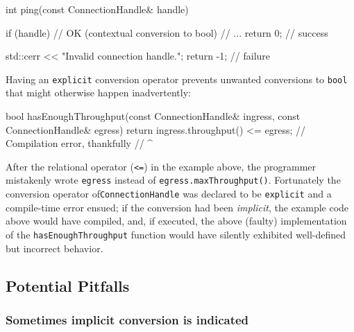 \begin{emcppslisting}[language=C++]
int ping(const ConnectionHandle& handle)
{
    if (handle)  // OK (contextual conversion to bool)
    {
        // ...
        return 0;  // success
    }

    std::cerr << "Invalid connection handle.\n";
    return -1;  // failure
}
\end{emcppslisting}
    
\noindent Having an \lstinline!explicit! conversion operator prevents unwanted
conversions to \lstinline!bool! that might otherwise happen inadvertently:

\begin{emcppslisting}[language=C++]
bool hasEnoughThroughput(const ConnectionHandle& ingress,
                         const ConnectionHandle& egress)
{
    return ingress.throughput() <= egress;  // Compilation error, thankfully
//                                    ^~~~~~
}
\end{emcppslisting}
    
\noindent After the relational operator (\lstinline!<=!) in the example above, the
programmer mistakenly wrote \lstinline!egress! instead of
\mbox{\lstinline!egress.maxThroughput()!}. Fortunately the conversion operator of\linebreak[4] %
\mbox{\lstinline!ConnectionHandle!} was declared to be \lstinline!explicit! and a
compile-time error ensued; if the conversion had
been \emph{implicit}, the example code above would have compiled, and,
if executed, the above (faulty) implementation of the \mbox{\lstinline!hasEnoughThroughput!}
function would have silently exhibited well-defined but incorrect
behavior.

\subsection[Potential Pitfalls]{Potential Pitfalls}\label{potential-pitfalls-explicitconv}

\subsubsection[Sometimes implicit conversion \emph{is} indicated]{Sometimes implicit conversion {\sfbsubsubsecitalRomeo is} indicated}\label{sometimes-implicit-conversion-is-indicated}

